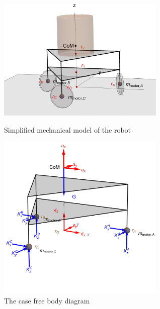\documentclass[12pt,english]{article}
\begin{document}
 \begin{figure}[htb!]
	\centering
	\includegraphics[width=8cm]{figures/robotModel}
	\caption{Simplified mechanical model of the robot}
	\label{robotModel}
	\endminipage\hfill
	\centering
	\includegraphics[width=8cm]{figures/caseFBD}
	\caption{The case free body diagram}
	\label{caseFBD}
	\endminipage\hfill
\end{figure}
\end{document}
